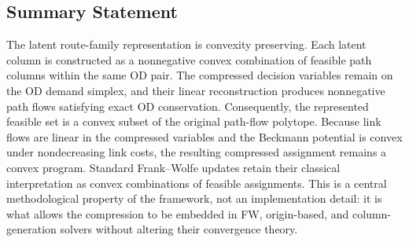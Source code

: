 \subsection{Summary Statement}
\label{sec:fw-origin-summary}

The latent route-family representation is convexity preserving. Each latent
column is constructed as a nonnegative convex combination of feasible path
columns within the same OD pair. The compressed decision variables remain on
the OD demand simplex, and their linear reconstruction produces nonnegative
path flows satisfying exact OD conservation. Consequently, the represented
feasible set is a convex subset of the original path-flow polytope. Because
link flows are linear in the compressed variables and the Beckmann potential
is convex under nondecreasing link costs, the resulting compressed assignment
remains a convex program. Standard Frank--Wolfe updates retain their classical
interpretation as convex combinations of feasible assignments. This is a
central methodological property of the framework, not an implementation
detail: it is what allows the compression to be embedded in FW, origin-based,
and column-generation solvers without altering their convergence theory.
